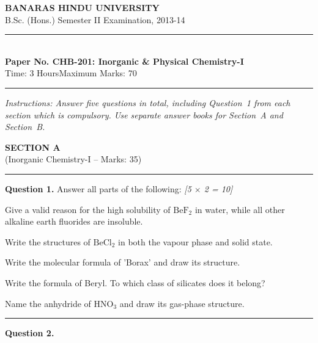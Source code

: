 \documentclass[11pt,a4paper]{article}
\newcommand{\pts}[1]{\hfill   \textit{[#1]}}
\begin{document}
\begin{center}
  {\large\bfseries BANARAS HINDU UNIVERSITY}\\[2pt]
  {\normalsize B.Sc. (Hons.) Semester II Examination, 2013-14}\\[6pt]
  \rule{0.8\linewidth}{0.5pt}\\[6pt]
  {\large\bfseries Paper No. CHB-201: Inorganic \& Physical Chemistry-I}\\[4pt]
  {\normalsize Time: 3 Hours\hfill Maximum Marks: 70}
\end{center}
\rule{\linewidth}{0.4pt}
\small



\noindent   \textit{Instructions: Answer five questions in total, including Question~1 from each section which is compulsory. Use separate answer books for Section~A and Section~B.}

\normalsize
\bigskip


\begin{center}
  {\large\bfseries SECTION A}\\[2pt]
  {\normalsize (Inorganic Chemistry-I -- Marks: 35)}
\end{center}
\rule{0.4\linewidth}{0.2pt}
\smallskip




\noindent   \textbf{Question 1.} Answer all parts of the following: \pts{5 $ \times$ 2 = 10}

\begin{parts}
  \item Give a valid reason for the high solubility of $ \text{BeF}_2$ in water, while all other alkaline earth fluorides are insoluble.
  \item Write the structures of $ \text{BeCl}_2$ in both the vapour phase and solid state.
  \item Write the molecular formula of 'Borax' and draw its structure.
  \item Write the formula of Beryl. To which class of silicates does it belong?
  \item Name the anhydride of $ \text{HNO}_3$ and draw its gas-phase structure.
\end{parts}

\medskip\rule{\linewidth}{0.2pt}




\noindent   \textbf{Question 2.}
\end{document}
